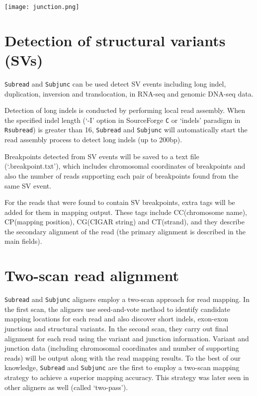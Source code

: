 \documentclass[12pt]{report}
\newcommand{\code}[1]{{\small\texttt{#1}}}
\begin{document}
\begin{center}
\texttt{[image: junction.png]}
\end{center}


\section{Detection of structural variants (SVs)}

\code{Subread} and \code{Subjunc} can be used detect SV events including long indel, duplication, inversion and translocation, in RNA-seq and genomic DNA-seq data.

Detection of long indels is conducted by performing local read assembly.
When the specified indel length (`-I' option in SourceForge \code{C} or `indels' paradigm in \code{Rsubread}) is greater than 16, \code{Subread} and \code{Subjunc} will automatically start the read assembly process to detect long indels (up to 200bp).

Breakpoints detected from SV events will be saved to a text file (`.breakpoint.txt'), which includes chromosomal coordinates of breakpoints and also the number of reads supporting each pair of breakpoints found from the same SV event.

For the reads that were found to contain SV breakpoints, extra tags will be added for them in mapping output.
These tags include CC(chromosome name), CP(mapping position), CG(CIGAR string) and CT(strand), and they describe the secondary alignment of the read (the primary alignment is described in the main fields).


\section{Two-scan read alignment}

\code{Subread} and \code{Subjunc} aligners employ a two-scan approach for read mapping.
In the first scan, the aligners use seed-and-vote method to identify candidate mapping locations for each read and also discover short indels, exon-exon junctions and structural variants.
In the second scan, they carry out final alignment for each read using the variant and junction information.
Variant and junction data (including chromosomal coordinates and number of supporting reads) will be output along with the read mapping results.
To the best of our knowledge, \code{Subread} and \code{Subjunc} are the first to employ a two-scan mapping strategy to achieve a superior mapping accuracy.
This strategy was later seen in other aligners as well (called `two-pass').
\end{document}
